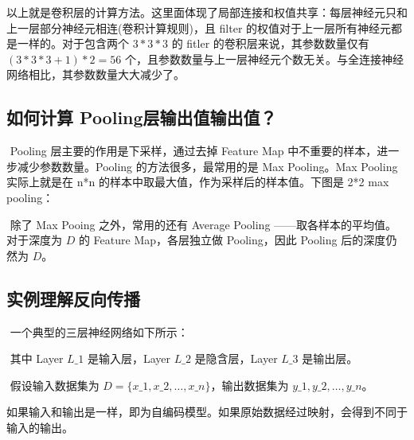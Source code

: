  

​
以上就是卷积层的计算方法。这里面体现了局部连接和权值共享：每层神经元只和上一层部分神经元相连(卷积计算规则)，且
filter 的权值对于上一层所有神经元都是一样的。对于包含两个 $ 3 * 3 * 3
$ 的 fitler 的卷积层来说，其参数数量仅有 $ (3 * 3 * 3+1) * 2 = 56 $
个，且参数数量与上一层神经元个数无关。与全连接神经网络相比，其参数数量大大减少了。

\subsection{ 如何计算 Pooling层输出值输出值？}\label{ux5982ux4f55ux8ba1ux7b97-pooling-ux5c42ux8f93ux51faux503cux8f93ux51faux503c}

​ Pooling 层主要的作用是下采样，通过去掉 Feature Map
中不重要的样本，进一步减少参数数量。Pooling 的方法很多，最常用的是 Max
Pooling。Max Pooling 实际上就是在 n*n
的样本中取最大值，作为采样后的样本值。下图是 2*2 max pooling：

 

​ 除了 Max Pooing 之外，常用的还有 Average Pooling
------取各样本的平均值。 ​ 对于深度为 $ D $ 的 Feature Map，各层独立做
Pooling，因此 Pooling 后的深度仍然为 $ D $。

\subsection{实例理解反向传播}\label{ux5b9eux4f8bux7406ux89e3ux53cdux5411ux4f20ux64ad}

​ 一个典型的三层神经网络如下所示：

 

​ 其中 Layer $ L\_1 $ 是输入层，Layer $ L\_2 $ 是隐含层，Layer $
L\_3 $ 是输出层。

​ 假设输入数据集为 $ D=\{x\_1, x\_2, \ldots{}, x\_n\} $，输出数据集为
$ y\_1, y\_2, \ldots{}, y\_n $。

​
如果输入和输出是一样，即为自编码模型。如果原始数据经过映射，会得到不同于输入的输出。

